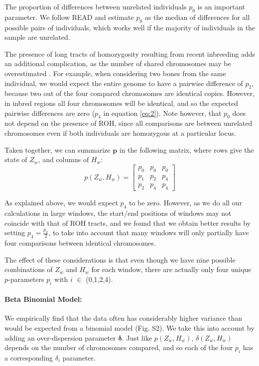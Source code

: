 \documentclass[12pt, letterpaper]{article}
\begin{document}
The proportion of differences between unrelated individuals $p_0$ is an important parameter. We follow READ \cite{kuhn_estimating_2018} and estimate $p_0$ as the median of differences for all possible pairs of individuals, which works well if the majority of individuals in the sample are unrelated.

The presence of long tracts of homozygosity resulting from recent inbreeding adds an additional complication, as the number of shared chromosomes may be overestimated \cite{weir_genetic_2006}. For example, when considering two bones from the same individual, we would expect the entire genome to have a pairwise difference of $p_2$, because two out of the four compared chromosomes are identical copies. However, in inbred regions all four chromosomes will be identical, and so the expected pairwise differences are zero ($p_4$ in equation \ref{eq:2}). Note however, that $p_0$ does not depend on the presence of ROH, since all comparisons are between unrelated chromosomes even if both individuals are homozygous at a particular locus.

Taken together, we can summarize $\bm{p}$ in the following matrix, where rows give the state of $Z_w$, and columns of $H_w$:
\begin{equation}\label{eq:2}
    p(Z_w, H_w) = \left[\begin{array}
{rrr}
p_0 & p_0 & p_0 \\
p_1 & p_2 & p_4 \\
p_2 & p_4 & p_4
\end{array}\right]
\end{equation}

As explained above, we would expect $p_4$ to be zero. However, as we do all our calculations in large windows, the start/end positions of windows may not coincide with that of ROH tracts, and we found that we obtain better results by setting $p_4 = \frac{p_2}{2}$, to take into account that many windows will only partially have four comparisons between identical chromosomes.

The effect of these considerations is that even though we have nine possible combinations of $Z_w$ and $H_w$ for each window, there are actually only four unique $p$-parameters $p_i$ with $i$ $\in$ (0,1,2,4).

\paragraph{Beta Binomial Model:}
We empirically find that the data often has considerably higher variance than would be expected from a binomial model (Fig. S2). We take this into account by adding an over-dispersion parameter $\bm{\delta}$. Just like $p(Z_w,H_w)$, $\delta(Z_w,H_w)$ depends on the number of chromosomes compared, and so each of the  four $p_i$ has a corresponding $\delta_i$ parameter.
\end{document}
